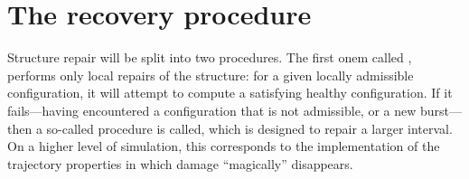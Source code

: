 \documentclass[12pt]{memoir}
\newcommand{\fld}[1]{\ensuremath{\textit{#1}}}
\newcommand{\R}{R}
\newcommand{\cDrift}{\fld{cDrift}}
\newcommand{\front}{\mathrm{front}}
\begin{document}




\section{The recovery procedure}\label{sec:recovery}

Structure repair will be split into two procedures.
The first onem called , performs
only local repairs of the structure: for a given locally admissible configuration,
it will attempt to compute a satisfying healthy configuration.
If it fails---having encountered a configuration that is not admissible, or
a new burst---then a so-called  procedure is called, which is designed
to repair a larger interval.
On a higher level of simulation, 
this corresponds to the implementation of the trajectory properties
in which damage ``magically'' disappears.
\end{document}
